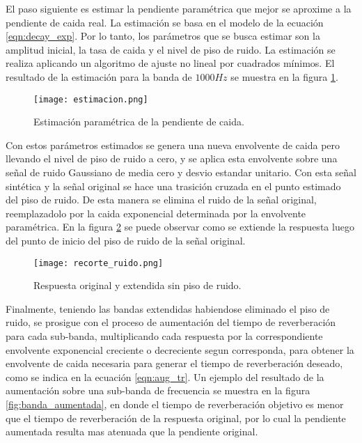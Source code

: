 El paso siguiente es estimar la pendiente paramétrica que mejor se aproxime a la pendiente de caida real. La estimación se basa en el modelo de la ecuación \ref{eqn:decay_exp}. Por lo tanto, los parámetros que se busca estimar son la amplitud inicial, la tasa de caida y el nivel de piso de ruido. La estimación se realiza aplicando un algoritmo de ajuste no lineal por cuadrados mínimos. El resultado de la estimación para la banda de $1000 Hz$ se muestra en la figura  \ref{fig:estimacion_parametrica}.

\begin{figure}[H]
	\centering{}
	\texttt{[image: estimacion.png]}
	\caption{Estimación paramétrica de la pendiente de caida.}
	\label{fig:estimacion_parametrica}
\end{figure}

Con estos parámetros estimados se genera una nueva envolvente de caida pero llevando el nivel de piso de ruido a cero, y se aplica esta envolvente sobre una señal de ruido Gaussiano de media cero y desvio estandar unitario. Con esta señal sintética y la señal original se hace una trasición cruzada en el punto estimado del piso de ruido. De esta manera se elimina el ruido de la señal original, reemplazadolo por la caida exponencial determinada por la envolvente paramétrica.  En la figura \ref{fig:recorte_ruido} se puede observar como se extiende la respuesta luego del punto de inicio del piso de ruido de la señal original.

\begin{figure}[H]
	\centering{}
	\texttt{[image: recorte\_ruido.png]}
	\caption{Respuesta original y extendida sin piso de ruido.}
	\label{fig:recorte_ruido}
\end{figure}

Finalmente, teniendo las bandas extendidas habiendose eliminado el piso de ruido, se prosigue con el proceso de aumentación del tiempo de reverberación para cada sub-banda, multiplicando cada respuesta por la correspondiente envolvente exponencial creciente o decreciente segun corresponda, para obtener la envolvente de caida necesaria para generar el tiempo de reverberación deseado, como se indica en la ecuación \ref{eqn:aug_tr}. Un ejemplo del resultado de la aumentación sobre una sub-banda de frecuencia se muestra en la figura \ref{fig:banda_aumentada}, en donde el tiempo de reverberación objetivo es menor que el tiempo de reverberación de la respuesta original, por lo cual la pendiente aumentada resulta mas atenuada que la pendiente original. 


